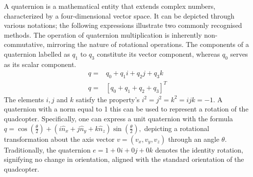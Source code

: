 \documentclass{article}
\begin{document}
A quaternion is a mathematical entity that extends complex numbers,
characterized by a four-dimensional vector space. It can be depicted through
various notations; the following expressions illustrate two commonly recognised
methods. The operation of quaternion multiplication is inherently
non-commutative, mirroring the nature of rotational operations. The components
of a quaternion labelled as \( q_1 \) to \( q_3 \) constitute its vector
component, whereas \( q_0 \) serves as its scalar component.
\begin{align}
  q =& q_0 + {q_1}i + {q_2}j + {q_3}k \\
  q =& [q_0 + q_1 + q_2 + q_3]^T
\end{align}
The elements \(i , j\) and \(k\) satisfy the property's \( i^2 = j^2 = k^2 = ijk
= -1 \). A quaternion with a norm equal to 1 this can be used to represent a
rotation of the quadcopter. Specifically, one can express a unit quaternion with
the formula \( q = \cos \left(\frac{\theta}{2}\right) + \left(i\hat{n}_x +
j\hat{n}_y + k\hat{n}_z\right) \sin \left(\frac{\theta}{2}\right), \) depicting
a rotational transformation about the axis vector \(v = (v_x, v_y, v_z) \)
through an angle \( \theta \). Traditionally, the quaternion \(e = 1 + 0i + 0j +
0k \) denotes the identity rotation, signifying no change in orientation,
aligned with the standard orientation of the quadcopter.
\end{document}
